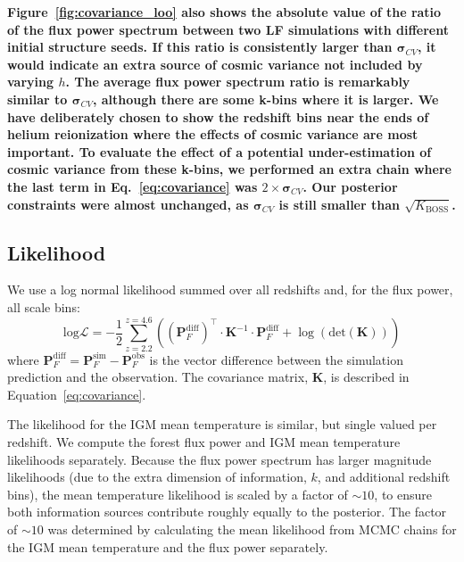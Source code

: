 \textbf{Figure~\ref{fig:covariance_loo} also shows the absolute value of the ratio of the flux power spectrum between two LF simulations with different initial structure seeds. If this ratio is consistently larger than $\boldsymbol{\sigma}_{CV}$, it would indicate an extra source of cosmic variance not included by varying $h$. The average flux power spectrum ratio is remarkably similar to $\boldsymbol{\sigma}_{CV}$, although there are some  k-bins where it is larger. We have deliberately chosen to show the redshift bins near the ends of helium reionization where the effects of cosmic variance are most important. To evaluate the effect of a potential under-estimation of cosmic variance from these k-bins, we performed an extra chain where the last term in Eq.~\ref{eq:covariance} was $2\times \boldsymbol{\sigma}_{CV}$. Our posterior constraints were almost unchanged, as $\boldsymbol{\sigma}_{CV}$ is still smaller than $\sqrt{K_\mathrm{BOSS}}$.}

\subsection{Likelihood}\label{sec:likelihood}

We use a log normal likelihood summed over all redshifts and, for the flux power, all scale bins:
\begin{equation}
    \mathrm{log}\mathcal{L} = -\frac{1}{2} \sum_{z=2.2}^{z=4.6} \left(\left(\boldsymbol{P}_F^{\mathrm{diff}}\right)^\top \cdot \boldsymbol{K}^{-1} \cdot \boldsymbol{P}_F^{\mathrm{diff}} + \log\left( \mathrm{det}(\boldsymbol{K})\right)\right)
    \label{eq:likelihood}
\end{equation}
where $\boldsymbol{P}_F^{\mathrm{diff}} = \boldsymbol{P}_F^{\mathrm{sim}} - \boldsymbol{P}_F^{\mathrm{obs}}$ is the vector difference between the simulation prediction and the observation.
The covariance matrix, $\boldsymbol{K}$, is described in Equation~\ref{eq:covariance}. 

The likelihood for the IGM mean temperature is similar, but single valued per redshift.
We compute the \lya forest flux power and IGM mean temperature likelihoods separately.
Because the flux power spectrum has larger magnitude likelihoods (due to the extra dimension of information, $k$, and additional redshift bins), the mean temperature likelihood is scaled by a factor of $\sim 10$, to ensure both information sources contribute roughly equally to the posterior.
The factor of $\sim 10$ was determined by calculating the mean likelihood from MCMC chains for the IGM mean temperature and the flux power separately.


